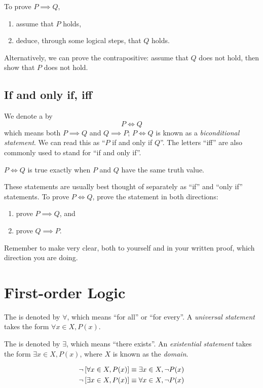 To prove $P \implies Q$,
\begin{enumerate}
\item assume that $P$ holds,
\item deduce, through some logical steps, that $Q$ holds.
\end{enumerate}
Alternatively, we can prove the contrapositive: assume that $Q$ does not hold, then show that $P$ does not hold.
\pagebreak

\subsection{If and only if, iff}
We denote a  by
\[P\iff Q\]
which means both $P \implies Q$ and $Q \implies P$; $P\iff Q$ is known as a \emph{biconditional statement}. We can read this as ``$P$ if and only if $Q$''. The letters ``iff'' are also commonly used to stand for ``if and only if''.

$P \iff Q$ is true exactly when $P$ and $Q$ have the same truth value.

These statements are usually best thought of separately as ``if'' and ``only if'' statements. To prove $P \iff Q$, prove the statement in both directions:
\begin{enumerate}
\item prove $P \implies Q$, and
\item prove $Q \implies P$.
\end{enumerate}
Remember to make very clear, both to yourself and in your written proof, which direction you are doing.
\pagebreak

\section{First-order Logic}
The  is denoted by $\forall$, which means ``for all'' or ``for every''. A \emph{universal statement} takes the form $\forall x\in X, P(x)$.

The  is denoted by $\exists$, which means ``there exists''. An \emph{existential statement} takes the form $\exists x\in X, P(x)$, where $X$ is known as the \emph{domain}.

\begin{lemma}
\begin{align*}
\lnot\left[\forall x\in X,P(x)\right]&\equiv\exists x\in X,\lnot P(x)\\
\lnot\left[\exists x\in X,P(x)\right]&\equiv\forall x\in X,\lnot P(x)
\end{align*}
\end{lemma}


